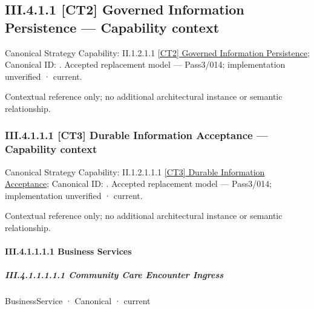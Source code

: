 \subsection*{III.4.1.1 [CT2] Governed Information Persistence — Capability context}
\label{navigation:III.4.1.1}

{\small Canonical Strategy Capability: II.1.2.1.1 \hyperref[element:05b64d34d550432a814485ab0c0dafcd]{[CT2] Governed Information Persistence}; Canonical ID: \texttt{}. Accepted replacement model — Pass3/014; implementation unverified · current.}\par
Contextual reference only; no additional architectural instance or semantic relationship.\par
\subsubsection*{III.4.1.1.1 [CT3] Durable Information Acceptance — Capability context}
\label{navigation:III.4.1.1.1}

{\small Canonical Strategy Capability: II.1.2.1.1.1 \hyperref[element:243b80f04f2542c8b0e63af2075b5a60]{[CT3] Durable Information Acceptance}; Canonical ID: \texttt{}. Accepted replacement model — Pass3/014; implementation unverified · current.}\par
Contextual reference only; no additional architectural instance or semantic relationship.\par
\paragraph*{III.4.1.1.1.1 Business Services}
\label{navigation:III.4.1.1.1.1}

\subparagraph*{III.4.1.1.1.1.1 Community Care Encounter Ingress}
\label{navigation:III.4.1.1.1.1.1}

\label{element:5806fe40300044b280a25fb86667e789}
{\small BusinessService · Canonical · current}\par

